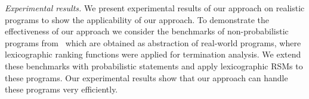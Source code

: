\begin{compactenum}
\item {\em Experimental results.} 
We present experimental results of our approach on realistic programs to show the applicability 
of our approach. 
To demonstrate the effectiveness of our approach we consider the benchmarks of non-probabilistic
programs from~\cite{ADFG10:lexicographic} which are obtained as abstraction of 
real-world programs, 
where 
lexicographic ranking functions were applied for termination analysis. 
We extend these benchmarks with probabilistic statements and apply lexicographic RSMs to these
programs. 
Our experimental results show that our approach can handle these programs very efficiently.


\end{compactenum}





